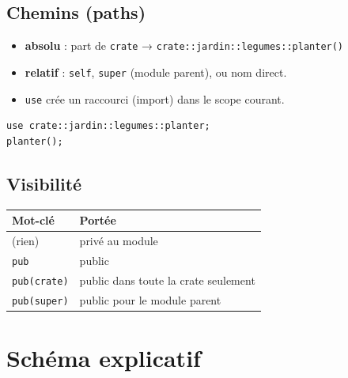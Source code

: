 \documentclass[11pt]{article}
\begin{document}
\subsection{Chemins (paths)}
\label{sec:orga1476c2}

\begin{itemize}
\item \textbf{absolu} : part de \texttt{crate} → \texttt{crate::jardin::legumes::planter()}
\item \textbf{relatif} : \texttt{self}, \texttt{super} (module parent), ou nom direct.
\item \texttt{use} crée un raccourci (import) dans le scope courant.
\end{itemize}

\begin{verbatim}
use crate::jardin::legumes::planter;
planter();
\end{verbatim}
\subsection{Visibilité}
\label{sec:org8ce9101}

\begin{center}
\begin{tabular}{ll}
Mot-clé & Portée\\
\hline
(rien) & privé au module\\
\texttt{pub} & public\\
\texttt{pub(crate)} & public dans toute la crate seulement\\
\texttt{pub(super)} & public pour le module parent\\
\end{tabular}
\end{center}
\section{Schéma explicatif}
\label{sec:org0f16377}
\end{document}
